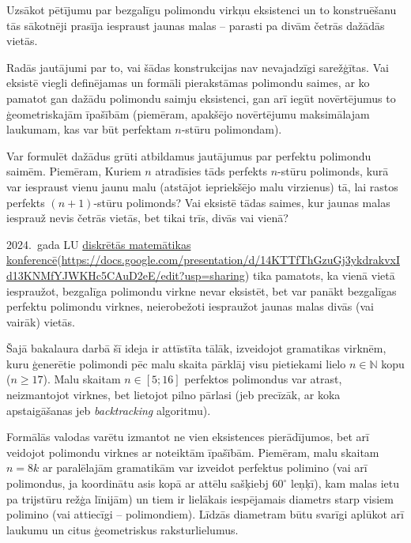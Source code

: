 \documentclass[utf8]{ludis2022}
\begin{document}
\firstparskip
Uzsākot pētījumu par bezgalīgu polimondu 
virkņu eksistenci un to konstruēšanu tās sākotnēji prasīja iespraust jaunas malas -- parasti pa divām četrās dažādās vietās. 

Radās jautājumi par to, vai šādas 
konstrukcijas nav nevajadzīgi 
sarežģītas. Vai eksistē viegli 
definējamas un formāli pierakstāmas 
polimondu saimes, ar ko pamatot 
gan dažādu polimondu saimju eksistenci, 
gan arī iegūt novērtējumus to ģeometriskajām
īpašībām (piemēram, apakšējo novērtējumu 
maksimālajam laukumam, kas var būt 
perfektam $n$-stūru polimondam). 

Var formulēt dažādus grūti 
atbildamus jautājumus par perfektu 
polimondu saimēm. Piemēram,
Kuriem $n$ atradīsies tāds 
perfekts $n$-stūru polimonds, kurā var
iespraust vienu jaunu malu (atstājot 
iepriekšējo malu virzienus) tā, lai 
rastos perfekts $(n+1)$-stūru polimonds?
Vai eksistē tādas saimes, kur 
jaunas malas iesprauž nevis četrās 
vietās, bet tikai trīs, divās vai vienā?

2024.\ gada LU \href{https://conferences.lu.lv/event/493/contributions/2217/}{diskrētās matemātikas konferencē}(\url{https://docs.google.com/presentation/d/14KTTfThGzuGj3ykdrakvxId13KNMfYJWKHc5CAuD2eE/edit?usp=sharing}) 
tika pamatots, ka vienā vietā iespraužot, bezgalīga 
polimondu virkne nevar eksistēt, bet var panākt bezgalīgas
perfektu polimondu virknes, 
neierobežoti iespraužot jaunas malas 
divās (vai vairāk) vietās. 

Šajā bakalaura darbā šī ideja ir attīstīta 
tālāk, izveidojot gramatikas virknēm, kuru 
ģenerētie polimondi pēc malu skaita 
pārklāj visu pietiekami lielo 
$n \in \mathbb{N}$ kopu ($n \geq 17$). 
Malu skaitam $n \in [5;16]$ 
perfektos polimondus var atrast, neizmantojot 
virknes, bet lietojot pilno pārlasi 
(jeb precīzāk, ar koka apstaigāšanas jeb 
{\em backtracking} algoritmu).


Formālās valodas varētu izmantot ne vien eksistences 
pierādījumos, bet arī veidojot polimondu virknes 
ar noteiktām īpašībām. Piemēram, malu skaitam $n = 8k$
ar paralēlajām gramatikām var izveidot perfektus polimino 
(vai arī polimondus, ja koordinātu asis kopā ar attēlu 
sašķiebj $60^{\circ}$ leņķī), kam 
malas ietu pa trijstūru režģa līnijām) un tiem ir 
lielākais iespējamais diametrs starp visiem polimino 
(vai attiecīgi -- polimondiem). Līdzās diametram būtu 
svarīgi aplūkot arī laukumu un citus ģeometriskus raksturlielumus.
\end{document}
